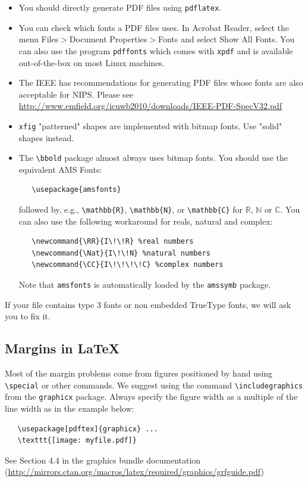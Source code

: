 \documentclass{article}
\begin{document}
\begin{itemize}

\item You should directly generate PDF files using \verb+pdflatex+.

\item You can check which fonts a PDF files uses.  In Acrobat Reader,
  select the menu Files$>$Document Properties$>$Fonts and select Show
  All Fonts. You can also use the program \verb+pdffonts+ which comes
  with \verb+xpdf+ and is available out-of-the-box on most Linux
  machines.

\item The IEEE has recommendations for generating PDF files whose
  fonts are also acceptable for NIPS. Please see
  \url{http://www.emfield.org/icuwb2010/downloads/IEEE-PDF-SpecV32.pdf}

\item \verb+xfig+ "patterned" shapes are implemented with bitmap
  fonts.  Use "solid" shapes instead.

\item The \verb+\bbold+ package almost always uses bitmap fonts.  You
  should use the equivalent AMS Fonts:
\begin{verbatim}
   \usepackage{amsfonts}
\end{verbatim}
followed by, e.g., \verb+\mathbb{R}+, \verb+\mathbb{N}+, or
\verb+\mathbb{C}+ for $\mathbb{R}$, $\mathbb{N}$ or $\mathbb{C}$.  You
can also use the following workaround for reals, natural and complex:
\begin{verbatim}
   \newcommand{\RR}{I\!\!R} %real numbers
   \newcommand{\Nat}{I\!\!N} %natural numbers
   \newcommand{\CC}{I\!\!\!\!C} %complex numbers
\end{verbatim}
Note that \verb+amsfonts+ is automatically loaded by the
\verb+amssymb+ package.

\end{itemize}

If your file contains type 3 fonts or non embedded TrueType fonts, we
will ask you to fix it.

\subsection{Margins in \LaTeX{}}

Most of the margin problems come from figures positioned by hand using
\verb+\special+ or other commands. We suggest using the command
\verb+\includegraphics+ from the \verb+graphicx+ package. Always
specify the figure width as a multiple of the line width as in the
example below:
\begin{verbatim}
   \usepackage[pdftex]{graphicx} ...
   \texttt{[image: myfile.pdf]}
\end{verbatim}
See Section 4.4 in the graphics bundle documentation
(\url{http://mirrors.ctan.org/macros/latex/required/graphics/grfguide.pdf})
\end{document}
